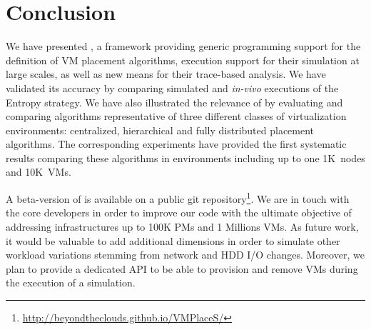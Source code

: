 \section{Conclusion}
\label{sec:conclusion}

We have presented \vmps, a framework providing generic programming
support for the definition of VM placement algorithms, execution
support for their simulation at large scales, as well as new means for
their trace-based analysis.
We have validated its accuracy by comparing simulated and
\textit{in-vivo} executions of the Entropy strategy.
We have also illustrated the relevance of \vmps by evaluating and
comparing algorithms representative of three different classes of
virtualization environments: centralized, hierarchical and fully
distributed placement algorithms.
The corresponding experiments have provided the first systematic results
comparing these algorithms in environments including up to one
1K~nodes and 10K~VMs. 

A beta-version of \vmps is available on a public git
repository\footnote{\url{http://beyondtheclouds.github.io/VMPlaceS/}}.
We are in touch with the \sg core developers in order to improve our
code with the ultimate objective of addressing infrastructures up to
100K PMs and 1 Millions VMs. As future work, it would be valuable to add
additional dimensions in order to simulate other workload variations
stemming from network and HDD I/O changes. Moreover,
we plan to provide a dedicated API to be able to
provision and remove VMs during the execution of a simulation.



